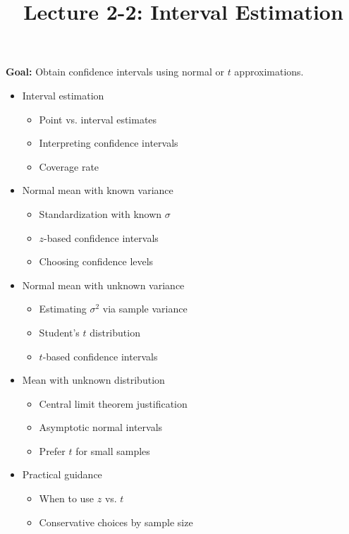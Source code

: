 \documentclass[12pt]{article}
\title{\Large Lecture 2-2: Interval Estimation}
\author{}
\date{}
\begin{document}
\maketitle
\vspace{-6em}

\noindent \textbf{Goal:} Obtain confidence intervals using normal or $t$ approximations.\medskip

\begin{itemize}\setlength{\itemsep}{1em}
\item Interval estimation
\begin{itemize}
\item Point vs. interval estimates
\item Interpreting confidence intervals
\item Coverage rate
\end{itemize}
\item Normal mean with known variance
\begin{itemize}
\item Standardization with known $\sigma$
\item $z$-based confidence intervals
\item Choosing confidence levels
\end{itemize}
\item Normal mean with unknown variance
\begin{itemize}
\item Estimating $\sigma^2$ via sample variance
\item Student's $t$ distribution
\item $t$-based confidence intervals
\end{itemize}
\item Mean with unknown distribution
\begin{itemize}
\item Central limit theorem justification
\item Asymptotic normal intervals
\item Prefer $t$ for small samples
\end{itemize}
\item Practical guidance
\begin{itemize}
\item When to use $z$ vs. $t$
\item Conservative choices by sample size
\end{itemize}
\end{itemize}


\clearpage
\end{document}
